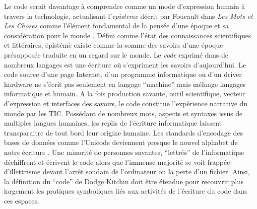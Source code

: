 Le code serait davantage à comprendre comme un mode d’expression humain à travers la technologie, actualisant l’\textit{episteme} décrit par Foucault dans \textit{Les Mots et Les Choses} comme l’élément fondamental de la pensée d’une époque et sa considération pour le monde \citep{Foucault1996}. Défini comme l’état des connaissances scientifiques et littéraires, épistémè existe comme la somme des savoirs d’une époque présupposée traduite en un regard sur le monde. Le \textit{code} exprimé dans de nombreux langages est une écriture où s’expriment les savoirs d’aujourd’hui. Le code source d’une page Internet, d’un programme informatique ou d’un driver hardware ne s’écrit pas seulement en langage “machine” mais mélange langages informatique et humain. A la fois production savante, outil scientifique, vecteur d’expression et interfaces des savoirs, le code constitue l’expérience narrative du monde par les TIC. Possédant de nombreux mots, aspects et syntaxes issus de multiples langues humaines, les replis de l’écriture informatique laissent transparaitre de tout bord leur origine humaine. Les standards d’encodage des bases de données comme l’Unicode deviennent presque le nouvel alphabet de notre écriture \citep{Guichard2014}. Une minorité de personnes savantes, “lettrés” de l’informatique déchiffrent et écrivent le code alors que l’immense majorité se voit frappée d’illettrisme devant l’arrêt soudain de l’ordinateur ou la perte d’un fichier. Ainsi, la définition du “code” de Dodge  Kitchin doit être étendue pour recouvrir plus largement les pratiques symboliques liés aux activités de l’écriture du code dans ces espaces.

